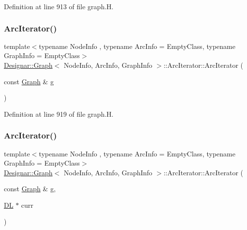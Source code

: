 Definition at line 913 of file graph.\+H.

\mbox{\label{class_designar_1_1_graph_1_1_arc_iterator_afeb58fdc5c6d4fd2d57c2ce53969203e}} 
\subsubsection{\texorpdfstring{Arc\+Iterator()}{ArcIterator()}\hspace{0.1cm}{\footnotesize\ttfamily [2/5]}}
{\footnotesize\ttfamily template$<$typename Node\+Info , typename Arc\+Info  = Empty\+Class, typename Graph\+Info  = Empty\+Class$>$ \\
\hyperlink{class_designar_1_1_graph}{Designar\+::\+Graph}$<$ Node\+Info, Arc\+Info, Graph\+Info $>$\+::Arc\+Iterator\+::\+Arc\+Iterator (\begin{DoxyParamCaption}\item[{const \hyperlink{class_designar_1_1_graph}{Graph} \&}]{g }\end{DoxyParamCaption})\hspace{0.3cm}{\ttfamily [inline]}}



Definition at line 919 of file graph.\+H.

\mbox{\label{class_designar_1_1_graph_1_1_arc_iterator_a2a9eb9d16ff5d80a22671dfdbe9ce3a2}} 
\subsubsection{\texorpdfstring{Arc\+Iterator()}{ArcIterator()}\hspace{0.1cm}{\footnotesize\ttfamily [3/5]}}
{\footnotesize\ttfamily template$<$typename Node\+Info , typename Arc\+Info  = Empty\+Class, typename Graph\+Info  = Empty\+Class$>$ \\
\hyperlink{class_designar_1_1_graph}{Designar\+::\+Graph}$<$ Node\+Info, Arc\+Info, Graph\+Info $>$\+::Arc\+Iterator\+::\+Arc\+Iterator (\begin{DoxyParamCaption}\item[{const \hyperlink{class_designar_1_1_graph}{Graph} \&}]{g,  }\item[{\hyperlink{class_designar_1_1_d_l}{DL} $\ast$}]{curr }\end{DoxyParamCaption})\hspace{0.3cm}{\ttfamily [inline]}}



